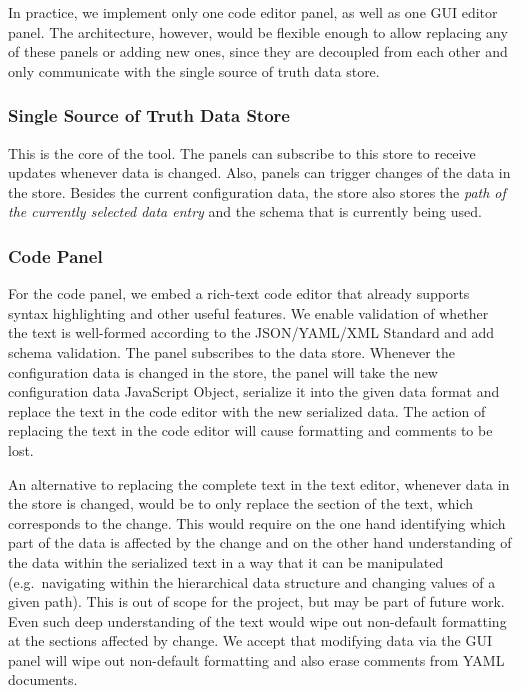 In practice, we implement only one code editor panel, as well as one GUI editor panel. 
The architecture, however, would be flexible enough to allow replacing any of these panels or adding new ones, since they are decoupled from each other and only communicate with the single source of truth data store.



\subsubsection{Single Source of Truth Data Store}
This is the core of the tool.
The panels can subscribe to this store to receive updates whenever data is changed.
Also, panels can trigger changes of the data in the store.
Besides the current configuration data, the store also stores the \textit{path of the currently selected data entry} and the schema that is currently being used.


\subsubsection{Code Panel}\label{subsubsec:design_text_editor_panel} 
For the code panel, we embed a rich-text code editor that already supports syntax highlighting and other useful features.
We enable validation of whether the text is well-formed according to the JSON/YAML/XML Standard and add schema validation.
The panel subscribes to the data store.
Whenever the configuration data is changed in the store, the panel will take the new configuration data JavaScript Object, serialize it into the given data format and replace the text in the code editor with the new serialized data.
The action of replacing the text in the code editor will cause formatting and comments to be lost.

An alternative to replacing the complete text in the text editor, whenever data in the store is changed, would be to only replace the section of the text, which corresponds to the change.
This would require on the one hand identifying which part of the data is affected by the change and on the other hand understanding of the data within the serialized text in a way that it can be manipulated (e.g.\ navigating within the hierarchical data structure and changing values of a given path).
This is out of scope for the project, but may be part of future work.
Even such deep understanding of the text would wipe out non-default formatting at the sections affected by change.
We accept that modifying data via the GUI panel will wipe out non-default formatting and also erase comments from YAML documents.

